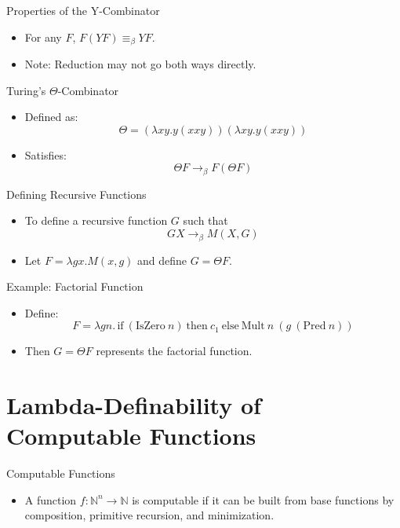 \documentclass{beamer}
\begin{document}
\begin{frame}{Properties of the Y-Combinator}
  \begin{itemize}
    \item For any \(F\), \(F (Y F) \equiv_\beta Y F\).
    \item Note: Reduction may not go both ways directly.
  \end{itemize}
\end{frame}

\begin{frame}{Turing's $\Theta$-Combinator}
  \begin{itemize}
    \item Defined as:
      \[
      \Theta = (\lambda x y. y(x x y)) (\lambda x y. y(x x y))
      \]
    \item Satisfies:
      \[
      \Theta F \rightarrow_\beta F (\Theta F)
      \]
  \end{itemize}
\end{frame}

\begin{frame}{Defining Recursive Functions}
  \begin{itemize}
    \item To define a recursive function \(G\) such that
      \[
      G X \rightarrow_\beta M(X, G)
      \]
    \item Let \(F = \lambda g x. M(x, g)\) and define \(G = \Theta F\).
  \end{itemize}
\end{frame}

\begin{frame}{Example: Factorial Function}
  \begin{itemize}
    \item Define:
      \[
      F = \lambda g n.\, \text{if}\ (\text{IsZero}\ n)\ \text{then}\ c_1\ \text{else}\ \text{Mult}\ n\ (g\ (\text{Pred}\ n))
      \]
    \item Then \(G = \Theta F\) represents the factorial function.
  \end{itemize}
\end{frame}

\section{Lambda-Definability of Computable Functions}
\begin{frame}{Computable Functions}
  \begin{itemize}
    \item A function \(f : \mathbb{N}^n \rightarrow \mathbb{N}\) is computable if it can be built from base functions by composition, primitive recursion, and minimization.
  \end{itemize}
\end{frame}
\end{document}
